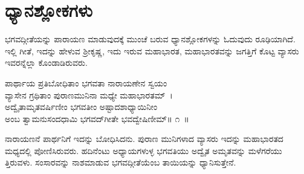 
\chapter{ಧ್ಯಾನಶ್ಲೋಕಗಳು}

ಭಗವದ್ಗೀತೆಯನ್ನು ಪಾರಾಯಣ ಮಾಡುವುದಕ್ಕೆ ಮುಂಚೆ ಬರುವ ಧ್ಯಾನಶ್ಲೋಕಗಳನ್ನು ಓದುವುದು ರೂಢಿಯಾಗಿದೆ. ಇಲ್ಲಿ ಗೀತೆ, ಇದನ್ನು ಹೇಳುವ ಶ‍್ರೀಕೃಷ್ಣ, ಇದು ಇರುವ ಮಹಾಭಾರತ, ಮಹಾಭಾರತವನ್ನು ಜಗತ್ತಿಗೆ ಕೊಟ್ಟ ವ್ಯಾಸರು ಇವರನ್ನೆಲ್ಲಾ ಕೊಂಡಾಡಿರುವರು.

\begin{shloka}
ಪಾರ್ಥಾಯ ಪ್ರತಿಬೋಧಿತಾಂ ಭಗವತಾ ನಾರಾಯಣೇನ ಸ್ವಯಂ\\ವ್ಯಾಸೇನ ಗ್ರಥಿತಾಂ ಪುರಾಣಮುನಿನಾ ಮಧ್ಯೇ ಮಹಾಭಾರತಮ್~।\\ಅದ್ವೈತಾಮೃತವರ್ಷಿಣೀಂ ಭಗವತೀಂ ಅಷ್ಟಾದಶಾಧ್ಯಾಯಿನೀಂ\\ಅಂಬ ತ್ವಾಮನುಸಂದಧಾಮಿ ಭಗವದ್​ಗೀತೇ ಭವದ್ವೇಷಿಣೀಮ್\hfill॥ ೧~॥
\end{shloka}

\begin{artha}
ನಾರಾಯಣನೆ ಪಾರ್ಥನಿಗೆ ಇದನ್ನು ಬೋಧಿಸಿದನು. ಪುರಾಣ ಮುನಿಗಳಾದ ವ್ಯಾಸರು ಇದನ್ನು ಮಹಾಭಾರತದ ಮಧ್ಯದಲ್ಲಿ ಪೋಣಿಸಿರುವರು. ಹದಿನೆಂಟು ಅಧ್ಯಾಯಗಳುಳ್ಳ ಭಗವತಿಯು ಅದ್ವೈತ ಅಮೃತವನ್ನು ಮಳೆಗರೆಯು ತ್ತಿರುವಳು. ಸಂಸಾರವನ್ನು ನಾಶಮಾಡುವ ಭಗವದ್ಗೀತೆ\-ಯೆಂಬ ತಾಯಿಯನ್ನು ಧ್ಯಾನಿಸುತ್ತೇನೆ.
\end{artha}

